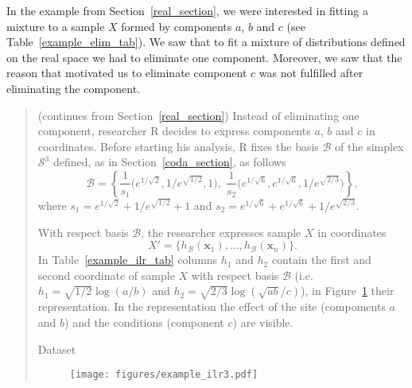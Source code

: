 \documentclass[10pt, a4paper]{article}
\begin{document}
% 

In the example from Section~\ref{real_section}, we were interested in fitting a mixture to a sample $X$ formed by components $a$, $b$ and $c$ (see Table~\ref{example_elim_tab}). We saw that to fit a mixture of distributions defined on the real space we had to eliminate one component. Moreover, we saw that the reason that motivated us to eliminate component $c$ was not fulfilled after eliminating the component.

\begin{quote}
(continues from Section~\ref{real_section}) Instead of eliminating one component, researcher R decides to express components $a$, $b$ and $c$ in coordinates. Before starting his analysis, R fixes the basis $\mathcal{B}$ of the simplex $\mathcal{S}^3$ defined, as in Section~\ref{coda_section}, as follows
\begin{equation}
\mathcal{B} = \left\{ \frac{1}{s_1}\Big( e^{1/\sqrt{2}}, 1/e^{\sqrt{1/2}}, 1 \Big), \; \frac{1}{s_2}\Big( e^{1/\sqrt{6}}, e^{1/\sqrt{6}}, 1/e^{\sqrt{2/3}} \Big) \right\},
\end{equation}
where $s_1 = e^{1/\sqrt{2}} + 1/e^{\sqrt{ 1/2}} + 1$ and $s_2= e^{1/\sqrt{6}} + e^{1/\sqrt{6}} + 1/e^{\sqrt{2/3}}$. 

With respect basis $\mathcal{B}$, the researcher expresses sample $X$ in coordinates 
\[X' = \{h_{\mathcal{B}}(\textbf{x}_1), \dots, h_{\mathcal{B}}(\textbf{x}_n)\}.\] In Table~\ref{example_ilr_tab} columns $h_1$ and $h_2$ contain the first and second coordinate of sample $X$ with respect basis $\mathcal{B}$ (i.e. $h_1 = \sqrt{1/2} \log(a/b)$ and $h_2 = \sqrt{2/3} \log(\sqrt{ab} / c)$), in Figure~\ref{example_ilr3} their representation. In the representation the effect of the site (compoments $a$ and $b$) and the conditions (component $c$) are visible.

\begin{table}
\centering
\scriptsize

\caption{Dataset}
\label{example_ilr_tab}
\end{table}

\begin{figure}[thbp]
\centering
\texttt{[image: figures/example\_ilr3.pdf]}
\caption{}\label{example_ilr3}
\end{figure}


\end{quote}
\end{document}
